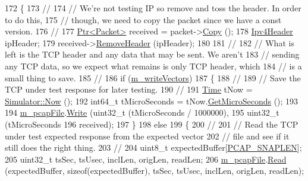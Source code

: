 \begin{DoxyCode}
172 \{
173   \textcolor{comment}{//}
174   \textcolor{comment}{// We're not testing IP so remove and toss the header.  In order to do this,}
175   \textcolor{comment}{// though, we need to copy the packet since we have a const version.}
176   \textcolor{comment}{//}
177   \hyperlink{classns3_1_1Ptr}{Ptr<Packet>} received = packet->\hyperlink{classns3_1_1Packet_a5d5c70802a5f77fc5f0001e0cfc1898b}{Copy} ();
178   \hyperlink{classns3_1_1Ipv4Header}{Ipv4Header} ipHeader;
179   received->\hyperlink{classns3_1_1Packet_a0961eccf975d75f902d40956c93ba63e}{RemoveHeader} (ipHeader);
180 
181   \textcolor{comment}{//}
182   \textcolor{comment}{// What is left is the TCP header and any data that may be sent.  We aren't}
183   \textcolor{comment}{// sending any TCP data, so we expect what remains is only TCP header, which}
184   \textcolor{comment}{// is a small thing to save.}
185   \textcolor{comment}{//}
186   \textcolor{keywordflow}{if} (\hyperlink{classNs3TcpStateTestCase_a0d2e59069324c4c41e805c543a8f1255}{m\_writeVectors})
187     \{
188       \textcolor{comment}{//}
189       \textcolor{comment}{// Save the TCP under test response for later testing.}
190       \textcolor{comment}{//}
191       \hyperlink{classns3_1_1Time}{Time} tNow = \hyperlink{group__simulator_gac3635e2e87f7ce316c89290ee1b01d0d}{Simulator::Now} ();
192       int64\_t tMicroSeconds = tNow.\hyperlink{classns3_1_1Time_a2542b9273c336da11fcaf54e8bc6e4c8}{GetMicroSeconds} ();
193 
194       \hyperlink{classNs3TcpStateTestCase_ada8803204d6270de2fe3ae0b9758f3a9}{m\_pcapFile}.\hyperlink{classns3_1_1PcapFile_a3920f5bae95ca0021875e6e9c2630ccf}{Write} (uint32\_t (tMicroSeconds / 1000000),
195                         uint32\_t (tMicroSeconds %
196                         received);
197     \}
198   \textcolor{keywordflow}{else}
199     \{
200       \textcolor{comment}{//}
201       \textcolor{comment}{// Read the TCP under test expected response from the expected vector}
202       \textcolor{comment}{// file and see if it still does the right thing.}
203       \textcolor{comment}{//}
204       uint8\_t expectedBuffer[\hyperlink{ns3tcp-state-test-suite_8cc_ae9a6b49b98d0c7917dda456f6771d2e1}{PCAP\_SNAPLEN}];
205       uint32\_t tsSec, tsUsec, inclLen, origLen, readLen;
206       \hyperlink{classNs3TcpStateTestCase_ada8803204d6270de2fe3ae0b9758f3a9}{m\_pcapFile}.\hyperlink{classns3_1_1PcapFile_a18c5045735408fe45a8cbc9e6b34a4fb}{Read} (expectedBuffer, \textcolor{keyword}{sizeof}(expectedBuffer), tsSec, tsUsec, inclLen, 
      origLen, readLen);

\end{DoxyCode}
